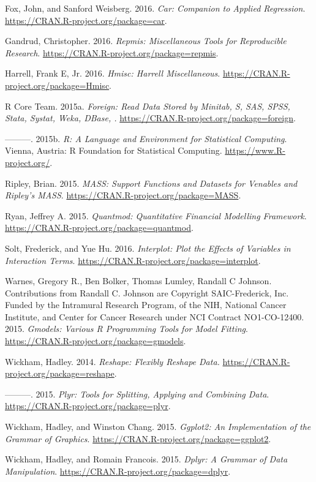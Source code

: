 \documentclass[]{article}
\begin{document}
\hypertarget{ref-R-car}{}
Fox, John, and Sanford Weisberg. 2016. \emph{Car: Companion to Applied
Regression}. \url{https://CRAN.R-project.org/package=car}.

\hypertarget{ref-R-repmis}{}
Gandrud, Christopher. 2016. \emph{Repmis: Miscellaneous Tools for
Reproducible Research}. \url{https://CRAN.R-project.org/package=repmis}.

\hypertarget{ref-R-Hmisc}{}
Harrell, Frank E, Jr. 2016. \emph{Hmisc: Harrell Miscellaneous}.
\url{https://CRAN.R-project.org/package=Hmisc}.

\hypertarget{ref-R-foreign}{}
R Core Team. 2015a. \emph{Foreign: Read Data Stored by Minitab, S, SAS,
SPSS, Stata, Systat, Weka, DBase, .}
\url{https://CRAN.R-project.org/package=foreign}.

\hypertarget{ref-CiteR}{}
---------. 2015b. \emph{R: A Language and Environment for Statistical
Computing}. Vienna, Austria: R Foundation for Statistical Computing.
\url{https://www.R-project.org/}.

\hypertarget{ref-R-MASS}{}
Ripley, Brian. 2015. \emph{MASS: Support Functions and Datasets for
Venables and Ripley's MASS}.
\url{https://CRAN.R-project.org/package=MASS}.

\hypertarget{ref-R-quantmod}{}
Ryan, Jeffrey A. 2015. \emph{Quantmod: Quantitative Financial Modelling
Framework}. \url{https://CRAN.R-project.org/package=quantmod}.

\hypertarget{ref-R-interplot}{}
Solt, Frederick, and Yue Hu. 2016. \emph{Interplot: Plot the Effects of
Variables in Interaction Terms}.
\url{https://CRAN.R-project.org/package=interplot}.

\hypertarget{ref-R-gmodels}{}
Warnes, Gregory R., Ben Bolker, Thomas Lumley, Randall C Johnson.
Contributions from Randall C. Johnson are Copyright SAIC-Frederick, Inc.
Funded by the Intramural Research Program, of the NIH, National Cancer
Institute, and Center for Cancer Research under NCI Contract
NO1-CO-12400. 2015. \emph{Gmodels: Various R Programming Tools for Model
Fitting}. \url{https://CRAN.R-project.org/package=gmodels}.

\hypertarget{ref-R-reshape}{}
Wickham, Hadley. 2014. \emph{Reshape: Flexibly Reshape Data.}
\url{https://CRAN.R-project.org/package=reshape}.

\hypertarget{ref-R-plyr}{}
---------. 2015. \emph{Plyr: Tools for Splitting, Applying and Combining
Data}. \url{https://CRAN.R-project.org/package=plyr}.

\hypertarget{ref-R-ggplot2}{}
Wickham, Hadley, and Winston Chang. 2015. \emph{Ggplot2: An
Implementation of the Grammar of Graphics}.
\url{https://CRAN.R-project.org/package=ggplot2}.

\hypertarget{ref-R-dplyr}{}
Wickham, Hadley, and Romain Francois. 2015. \emph{Dplyr: A Grammar of
Data Manipulation}. \url{https://CRAN.R-project.org/package=dplyr}.
\end{document}
